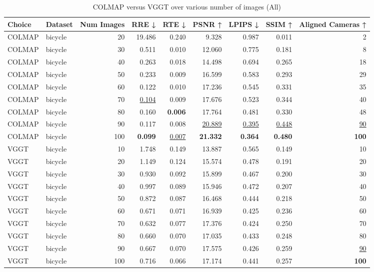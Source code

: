 \begin{table}[H]
\caption{COLMAP versus VGGT over various number of images (All)}
\label{tab:01_num_images_all}
\small
\begin{tabular}{llrrrrrrr}
\toprule
Choice & Dataset & Num Images & RRE ↓ & RTE ↓ & PSNR ↑ & LPIPS ↓ & SSIM ↑ & Aligned Cameras ↑ \\
\midrule
COLMAP & bicycle & 20 & 19.486 & 0.240 & 9.328 & 0.987 & 0.011 & 2 \\
COLMAP & bicycle & 30 & 0.511 & 0.010 & 12.060 & 0.775 & 0.181 & 8 \\
COLMAP & bicycle & 40 & 0.263 & 0.018 & 14.498 & 0.694 & 0.265 & 18 \\
COLMAP & bicycle & 50 & 0.233 & 0.009 & 16.599 & 0.583 & 0.293 & 29 \\
COLMAP & bicycle & 60 & 0.122 & 0.010 & 17.236 & 0.545 & 0.331 & 35 \\
COLMAP & bicycle & 70 & \underline{0.104} & 0.009 & 17.676 & 0.523 & 0.344 & 40 \\
COLMAP & bicycle & 80 & 0.160 & \textbf{0.006} & 17.764 & 0.481 & 0.330 & 48 \\
COLMAP & bicycle & 90 & 0.117 & 0.008 & \underline{20.889} & \underline{0.395} & \underline{0.448} & \underline{90} \\
COLMAP & bicycle & 100 & \textbf{0.099} & \underline{0.007} & \textbf{21.332} & \textbf{0.364} & \textbf{0.480} & \textbf{100} \\
VGGT & bicycle & 10 & 1.748 & 0.149 & 13.887 & 0.565 & 0.149 & 10 \\
VGGT & bicycle & 20 & 1.149 & 0.124 & 15.574 & 0.478 & 0.191 & 20 \\
VGGT & bicycle & 30 & 0.930 & 0.092 & 15.899 & 0.467 & 0.200 & 30 \\
VGGT & bicycle & 40 & 0.997 & 0.089 & 15.946 & 0.472 & 0.207 & 40 \\
VGGT & bicycle & 50 & 0.872 & 0.087 & 16.468 & 0.444 & 0.218 & 50 \\
VGGT & bicycle & 60 & 0.671 & 0.071 & 16.939 & 0.425 & 0.236 & 60 \\
VGGT & bicycle & 70 & 0.632 & 0.077 & 17.376 & 0.424 & 0.250 & 70 \\
VGGT & bicycle & 80 & 0.660 & 0.070 & 17.035 & 0.433 & 0.248 & 80 \\
VGGT & bicycle & 90 & 0.667 & 0.070 & 17.575 & 0.426 & 0.259 & \underline{90} \\
VGGT & bicycle & 100 & 0.716 & 0.066 & 17.174 & 0.441 & 0.257 & \textbf{100} \\

\end{tabular}
\end{table}
